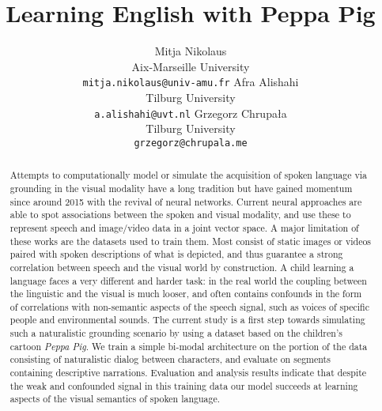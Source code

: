\documentclass[11pt,a4paper]{article}
\begin{document}
\title{Learning English with Peppa Pig}

\author{Mitja Nikolaus\\
  Aix-Marseille University\\
  \texttt{mitja.nikolaus@univ-amu.fr}
  \And
  Afra Alishahi\\
  Tilburg University\\
  \texttt{a.alishahi@uvt.nl}
  \AND
  Grzegorz Chrupała\\
  Tilburg University\\
  \texttt{grzegorz@chrupala.me}}

\date{}


\maketitle
\begin{abstract}
  Attempts to computationally model or simulate the acquisition of
  spoken language via grounding in the visual modality have a long
  tradition but have gained momentum since around 2015 with the
  revival of neural networks. Current neural approaches are able to
  spot associations between the spoken and visual modality, and use
  these to represent speech and image/video data in a joint vector
  space. A major limitation of these works are the datasets used to
  train them. Most consist of static images or videos paired with
  spoken descriptions of what is depicted, and thus guarantee a strong
  correlation between speech and the visual world by construction. A
  child learning a language faces a very different and harder task: in
  the real world the coupling between the linguistic and the visual is
  much looser, and often contains confounds in the form of
  correlations with non-semantic aspects of the speech signal, such as
  voices of specific people and environmental sounds. The current
  study is a first step towards simulating such a naturalistic
  grounding scenario by using a dataset based on the children's
  cartoon {\it Peppa Pig}. We train a simple bi-modal architecture on
  the portion of the data consisting of naturalistic dialog between
  characters, and evaluate on segments containing descriptive
  narrations. Evaluation and analysis results indicate that despite
  the weak and confounded signal in this training data our model
  succeeds at learning aspects of the visual semantics of spoken
  language.
\end{abstract}









\end{document}
